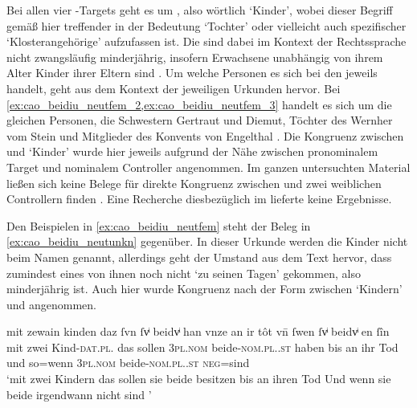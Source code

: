 Bei allen vier -Targets geht es um , also wörtlich
`Kinder', wobei dieser Begriff gemäß \citet[s.\,v.~]{lexer:mhdhwb}
hier treffender in der Bedeutung `Tochter'
 oder vielleicht
auch spezifischer `Klosterangehörige'
 aufzufassen ist.
Die  sind dabei im Kontext der Rechtssprache nicht zwangsläufig
minderjährig, insofern Erwachsene unabhängig von ihrem Alter Kinder ihrer
Eltern sind \autocites[vgl.][1736]{schwab2012}[siehe
auch][258--259]{birkenesfleischer2022}. Um welche Personen es sich bei den
 jeweils handelt, geht aus dem Kontext der jeweiligen Urkunden
hervor. Bei \cref{ex:cao_beidiu_neutfem_2,ex:cao_beidiu_neutfem_3} handelt es
sich um die gleichen Personen, die Schwestern Gertraut und Diemut, Töchter des
Wernher vom Stein und Mitglieder des Konvents von Engelthal
\autocite[Kr.~Nürnberger Land; vgl.][619]{caor}.
%
Die Kongruenz zwischen  und  `Kinder' wurde hier
jeweils aufgrund der Nähe zwischen pronominalem Target und nominalem Controller
angenommen. Im ganzen unter\-suchten Material ließen sich keine Belege für
direkte Kongruenz zwischen  und zwei weiblichen Controllern finden%
. Eine Recherche diesbezüglich im
\REM{} lieferte keine Ergeb\-nisse.

Den Beispielen in \cref{ex:cao_beidiu_neutfem} steht der Beleg in
\cref{ex:cao_beidiu_neutunkn} gegenüber. In dieser Urkunde werden die Kinder
nicht beim Namen genannt, allerdings geht der Umstand aus dem Text hervor, dass
zumindest eines von ihnen noch nicht  `zu seinen
Tagen' \autocites[\pno~214, 218.18--19]{cao1}[vgl.][26]{caor} gekommen, also
minderjährig ist. Auch hier wurde Kongruenz nach der Form zwischen
 `Kindern' und  angenommen.

\begin{exe}
\ex \label{ex:cao_beidiu_neutunkn}
	\gll mit zewain kinden \textelp{} daz ſvn ſvͥ
		beidvͥ han vnze an ir tôt \textelp{} vn̄ ſwen
		ſvͥ beidvͥ {en ſîn}
		\textelp{} \\
		mit zwei Kind-\textsc{dat.pl.\NeutX} {} das sollen
		\textsc{3pl\subX.nom} beide-\textsc{nom.pl.\NeutX.st} haben bis an ihr
		Tod {} und so=wenn \textsc{3pl\subX.nom}
		beide-\textsc{nom.pl.\NeutX.st} \textsc{neg}=sind {} \\
	\trans `mit zwei Kindern \textelp{} das sollen sie beide besitzen
		bis an ihren Tod \textelp{} Und wenn sie beide irgendwann nicht
		 sind \textelp{}'
		\parencites(Nr.~214, Rottweil, 1274)[218.17--24]{cao1}
\end{exe}

